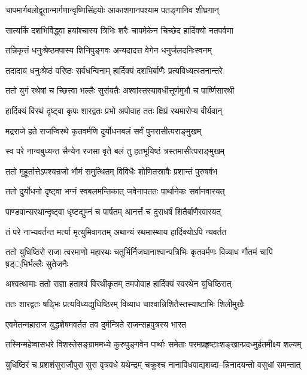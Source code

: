 \twolineshloka
{चापमार्गबलोद्वूतान्मार्गणान्वृष्णिसिंहयोः}
{आकाशगानपश्याम पतङ्गानिव शीघ्रगान्}


\twolineshloka
{सात्यकिं दशभिर्विद्ध्वा हयांश्चास्य त्रिभिः शरैः}
{चापमेकेन चिच्छेद हार्दिक्यो नतपर्वणा}


\twolineshloka
{तन्निकृत्तं धनुःश्रेष्ठमपास्य शिनिपुङ्गवः}
{अन्यदादत्त वेगेन धनुर्जलदनिःस्वनम्}


\twolineshloka
{तदादाय धनुःश्रेष्ठं वरिष्ठः सर्वधन्विनाम्}
{हार्दिक्यं दशभिर्बाणैः प्रत्यविध्यत्स्तनान्तरे}


\twolineshloka
{ततो युगं रथेषां च च्छित्त्वा भल्लैः सुसंयतैः}
{अश्वांस्तस्यावधीत्तूर्णमुभौ च पार्ष्णिसारथी}


\twolineshloka
{हार्दिक्यं विरथं दृष्ट्वा कृपः शारद्वतः प्रभो}
{अपोवाह ततः क्षिप्रं रथमारोप्य वीर्यवान्}


\twolineshloka
{मद्रराजे हते राजन्विरथे कृतवर्मणि}
{दुर्योधनबलं सर्वं पुनरासीत्पराङ्मुखम्}


\twolineshloka
{स्व परे नान्वबुध्यन्त सैन्येन रजसा वृते}
{बलं तु हतभूयिष्ठं त्रस्तमासीत्पराङ्मुखम्}


\twolineshloka
{ततो मुहूर्तात्तेऽपश्यन्रजो भौमं समुत्थितम्}
{विविधैः शोणितस्रावैः प्रशान्तं पुरुषर्षभ}


\twolineshloka
{ततो दुर्योधनो दृष्ट्वा भग्नं स्वबलमन्तिकात्}
{जवेनापततः पार्थानेकः सर्वानवारयत्}


\twolineshloka
{पाण्डवान्सरथान्दृष्ट्वा धृष्टद्युम्नं च पार्षतम्}
{आनर्त्तं च दुराधर्षं शितैर्बाणैरवारयत्}


\twolineshloka
{तं परे नाभ्यवर्तन्त मर्त्या मृत्युमिवागतम्}
{अथान्यं रथमास्थाय हार्दिक्योऽपि न्यवर्तत}


\threelineshloka
{ततो युधिष्ठिरो राजा त्वरमाणो महारथः}
{चतुर्भिर्निजघानाश्वान्पत्रिभिः कृतवर्मणः}
{विव्याध गौतमं चापि ष़ड््भिर्भल्लैः सुतेजनैः}


\twolineshloka
{अश्वत्थामाः ततो राज्ञा हताश्वं विरथीकृतम्}
{तमपोवाह हार्दिक्यं स्वरथेन युधिष्ठिरात्}


\twolineshloka
{ततः शारद्वतः षड्भिः प्रत्यविध्यद्युधिष्ठिरम्}
{विव्याध चाश्वान्निशितैस्तस्याष्टाभिः शिलीमुखैः}


\twolineshloka
{एवमेतन्महाराज युद्धशेषमवर्तत}
{तव दुर्मन्त्रिते राजन्सहपुत्रस्य भारत}


\twolineshloka
{तस्मिन्महेष्वासधरे विशस्तेसङ्ग्राममध्ये कुरुपुङ्गवेन}
{पार्थाः समेताः परमप्रहृष्टाःशङ्खान्प्रदध्मुर्हतमीक्ष्य शल्यम्}


\twolineshloka
{युधिष्ठिरं च प्रशशंसुराजौपुरा सुरा वृत्रवधे यथेन्द्रम्}
{चक्रुश्च नानाविधवाद्यशब्दा--न्निनादयन्तो वसुधां समन्तात्}


